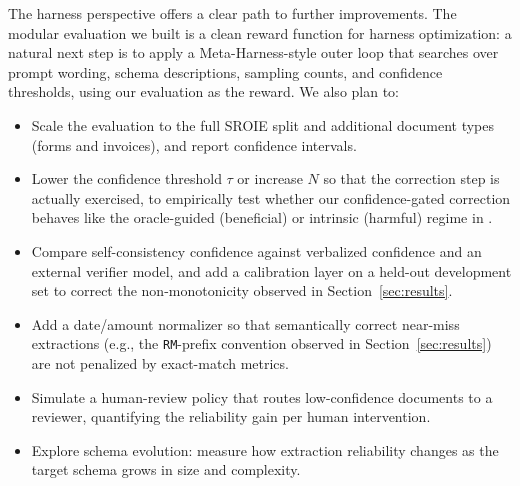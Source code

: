 \documentclass[conference]{IEEEtran}
\begin{document}
The harness perspective offers a clear path to further improvements. The modular evaluation we built is a clean reward function for harness optimization: a natural next step is to apply a Meta-Harness-style outer loop \cite{b2} that searches over prompt wording, schema descriptions, sampling counts, and confidence thresholds, using our evaluation as the reward. We also plan to:
\begin{itemize}
    \item Scale the evaluation to the full SROIE split and additional document types (forms and invoices), and report confidence intervals.
    \item Lower the confidence threshold \(\tau\) or increase \(N\) so that the correction step is actually exercised, to empirically test whether our confidence-gated correction behaves like the oracle-guided (beneficial) or intrinsic (harmful) regime in \cite{b3}.
    \item Compare self-consistency confidence against verbalized confidence and an external verifier model, and add a calibration layer on a held-out development set to correct the non-monotonicity observed in Section~\ref{sec:results}.
    \item Add a date/amount normalizer so that semantically correct near-miss extractions (e.g., the \texttt{RM}-prefix convention observed in Section~\ref{sec:results}) are not penalized by exact-match metrics.
    \item Simulate a human-review policy that routes low-confidence documents to a reviewer, quantifying the reliability gain per human intervention.
    \item Explore schema evolution: measure how extraction reliability changes as the target schema grows in size and complexity.
\end{itemize}
\end{document}

